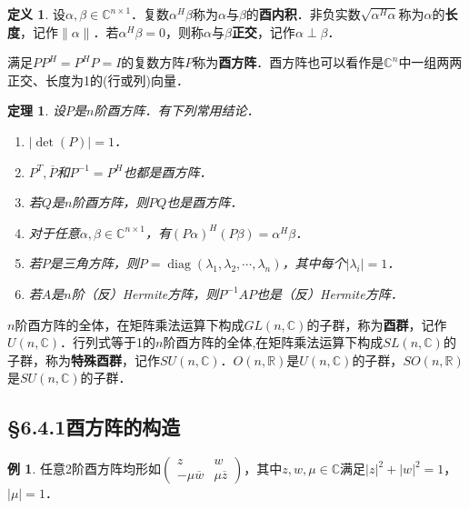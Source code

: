 \documentclass[a4paper,fontset=windows]{ctexbook}
\newtheorem{theorem}{定理}[chapter]
\theoremstyle{definition}
\newtheorem{definition}{定义}[chapter]
\newtheorem{example}{例}[chapter]
\DeclareMathOperator{\diag}{diag}
\begin{document}
\begin{definition}
设$\alpha,\beta\in\mathbb{C}^{n\times 1}$．复数$\alpha^H\beta$称为$\alpha$与$\beta$的{\bf 酉内积}．非负实数$\sqrt{\alpha^H\alpha}$称为$\alpha$的{\bf 长度}，记作$\|\alpha\|$．若$\alpha^H\beta=0$，则称$\alpha$与$\beta${\bf 正交}，记作$\alpha\perp\beta$．

满足$PP^H=P^HP=I$的复数方阵$P$称为{\bf 酉方阵}．酉方阵也可以看作是$\mathbb{C}^n$中一组两两正交、长度为1的(行或列)向量．
\end{definition}

\begin{theorem}\label{thm6.11}
设$P$是$n$阶酉方阵．有下列常用结论．
\begin{enumerate}
\item $|\det(P)|=1$．

\item $P^T,\overline{P}$和$P^{-1}=P^H$也都是酉方阵．

\item 若$Q$是$n$阶酉方阵，则$PQ$也是酉方阵．

\item 对于任意$\alpha,\beta\in\mathbb{C}^{n\times 1}$，有$(P\alpha)^H(P\beta)=\alpha^H\beta$．

\item 若$P$是三角方阵，则$P=\diag(\lambda_1,\lambda_2,\cdots,\lambda_n)$，其中每个$|\lambda_i|=1$．

\item 若$A$是$n$阶（反）Hermite方阵，则$P^{-1}AP$也是（反）Hermite方阵．
\end{enumerate}
\end{theorem}

$n$阶酉方阵的全体，在矩阵乘法运算下构成$GL(n,\mathbb{C})$的子群，称为{\bf 酉群}，记作$U(n,\mathbb{C})$．\linebreak 行列式等于1的$n$阶酉方阵的全体,在矩阵乘法运算下构成$SL(n,\mathbb{C})$的子群，称为{\bf 特殊酉群}，记作$SU(n,\mathbb{C})$．$O(n,\mathbb{R})$是$U(n,\mathbb{C})$的子群，$SO(n,\mathbb{R})$是$SU(n,\mathbb{C})$的子群．

\subsection*{\S 6.4.1\quad 酉方阵的构造}

\begin{example}\label{ex6.11}
任意2阶酉方阵均形如$\begin{pmatrix}z&w \\ -\mu\overline{w}&\mu\overline{z}\end{pmatrix}$，其中$z,w,\mu\in\mathbb{C}$满足$|z|^2+|w|^2=1$，$|\mu|=1$．
\end{example}
\end{document}
